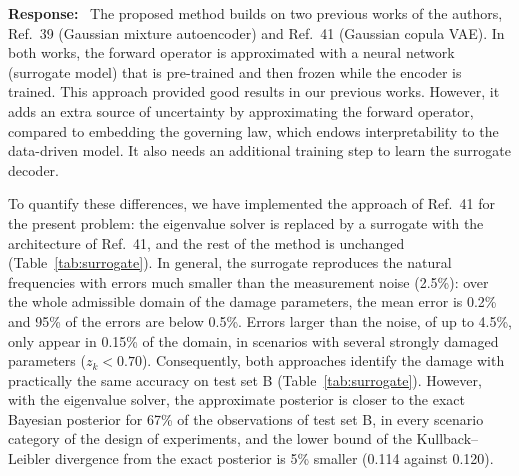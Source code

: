 \documentclass[11pt]{article}
\newenvironment{response}{\par\smallskip\noindent\color{resp}\textbf{Response:}\ }{\par}
\begin{document}
\begin{response}
The proposed method builds on two previous works of the authors, Ref.~39 (Gaussian mixture autoencoder) and Ref.~41 (Gaussian copula VAE).
In both works, the forward operator is approximated with a neural network (surrogate model) that is pre-trained and then frozen while the encoder is trained.
This approach provided good results in our previous works.
However, it adds an extra source of uncertainty by approximating the forward operator, compared to embedding the governing law, which endows interpretability to the data-driven model.
It also needs an additional training step to learn the surrogate decoder.

To quantify these differences, we have implemented the approach of Ref.~41 for the present problem: the eigenvalue solver is replaced by a surrogate with the architecture of Ref.~41, and the rest of the method is unchanged (Table~\ref{tab:surrogate}).
In general, the surrogate reproduces the natural frequencies with errors much smaller than the measurement noise (2.5\%): over the whole admissible domain of the damage parameters, the mean error is 0.2\% and 95\% of the errors are below 0.5\%.
Errors larger than the noise, of up to 4.5\%, only appear in 0.15\% of the domain, in scenarios with several strongly damaged parameters ($z_k<0.70$).
Consequently, both approaches identify the damage with practically the same accuracy on test set B (Table~\ref{tab:surrogate}).
However, with the eigenvalue solver, the approximate posterior is closer to the exact Bayesian posterior for 67\% of the observations of test set B, in every scenario category of the design of experiments, and the lower bound of the Kullback--Leibler divergence from the exact posterior is 5\% smaller (0.114 against 0.120).


\end{response}
\end{document}
